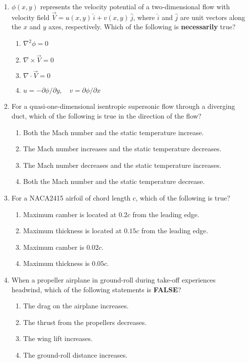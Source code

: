 \documentclass[12pt]{article}
\begin{document}
\begin{enumerate}[label=Q.\arabic*]
	\item $\phi(x,y)$ represents the velocity potential of a two-dimensional flow with velocity field $\vec{V} = u(x,y)\,\hat{i} + v(x,y)\,\hat{j}$, where $\hat{i}$ and $\hat{j}$ are unit vectors along the $x$ and $y$ axes, respectively. Which of the following is \textbf{necessarily} true?
		\begin{multicols}{2}
			\begin{enumerate}[label=(\Alph*)]
				\item $\nabla^2 \phi = 0$
				\item $\nabla \times \vec{V} = 0$
				\item $\nabla \cdot \vec{V} = 0$
				\item $u = -\partial \phi / \partial y,\quad v = \partial \phi / \partial x$
			\end{enumerate}
		\end{multicols}

	\item For a quasi-one-dimensional isentropic supersonic flow through a diverging duct, which of the following is true in the direction of the flow?
		\begin{enumerate}[label=(\Alph*)]
			\item Both the Mach number and the static temperature increase.
			\item The Mach number increases and the static temperature decreases.
			\item The Mach number decreases and the static temperature increases.
			\item Both the Mach number and the static temperature decrease.
		\end{enumerate}

	\item For a NACA2415 airfoil of chord length $c$, which of the following is true?
		\begin{enumerate}[label=(\Alph*)]
			\item Maximum camber is located at $0.2c$ from the leading edge.
			\item Maximum thickness is located at $0.15c$ from the leading edge.
			\item Maximum camber is $0.02c$.
			\item Maximum thickness is $0.05c$.
		\end{enumerate}
		\newpage
	\item When a propeller airplane in ground-roll during take-off experiences headwind, which of the following statements is \textbf{FALSE}?
		\begin{multicols}{2}
			\begin{enumerate}[label=(\Alph*)]
				\item The drag on the airplane increases.
				\item The thrust from the propellers decreases.
				\item The wing lift increases.
				\item The ground-roll distance increases.
			\end{enumerate}
		\end{multicols}


\end{enumerate}
\end{document}
